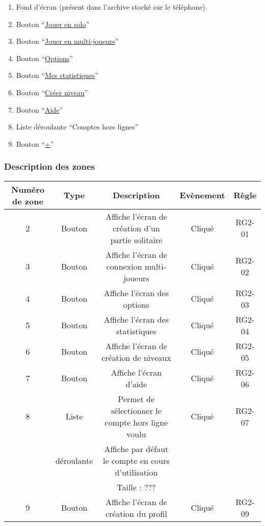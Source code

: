 \documentclass{report}
\begin{document}
		\begin{center}	
			
		\end{center}

		\begin{enumerate}
		  \item Fond d'écran (présent dans l'archive stocké sur le téléphone).
		  \item Bouton ``\hyperlink{Creer partie solo}{Jouer en solo}''
		  \item Bouton ``\hyperlink{Connexion multi-joueurs}{Jouer en multi-joueurs}''
		  \item Bouton ``\hyperlink{Options}{Options}''
		  \item Bouton ``\hyperlink{Statistiques}{Mes statistiques}''
		  \item Bouton ``\hyperlink{Creer niveau}{Créer niveau}''
		  \item Bouton ``\hyperlink{Aide}{Aide}''
		  \item Liste déroulante ``Comptes hors lignes''
		  \item Bouton ``\hyperlink{profil}{+}'' 
		\end{enumerate}

		\subsubsection{Description des zones}
		
		\begin{tabular}{|c|c|c|c|c|} \hline
			Numéro de zone & Type  & Description & Evènement &	Règle \\\hline 
			2 & Bouton & Affiche l'écran de création d'un partie solitaire & Cliqué & RG2-01 \\\hline
			3 & Bouton & Affiche l'écran de connexion multi-joueurs & Cliqué & RG2-02 \\\hline
			4 & Bouton & Affiche l'écran des options & Cliqué & RG2-03 \\\hline
			5 & Bouton & Affiche l'écran des statistiques & Cliqué & RG2-04 \\\hline
			6 & Bouton & Affiche l'écran de création de niveaux & Cliqué & RG2-05 \\\hline
			7 & Bouton & Affiche l'écran d'aide & Cliqué & RG2-06 \\\hline
			8 & Liste & Permet de sélectionner le compte hors ligne voulu & Cliqué & RG2-07 \\ 
			  & déroulante & Affiche par défaut le compte en cours d'utilisation & & \\
			  & & Taille : ??? & & \\\hline
			9 & Bouton & Affiche l'écran de création du profil & Cliqué & RG2-09 \\\hline
			
		\end{tabular}
		
\end{document}
